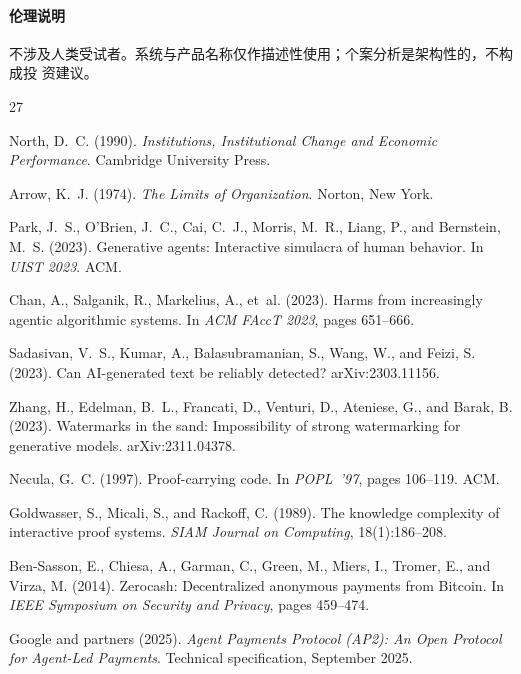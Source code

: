 \documentclass[11pt,UTF8]{ctexart}
\begin{document}
\paragraph*{伦理说明}
不涉及人类受试者。系统与产品名称仅作描述性使用；个案分析是架构性的，不构成投
资建议。
\begin{thebibliography}{27}
\small\setlength{\itemsep}{2pt}

North, D.~C. (1990). \emph{Institutions, Institutional Change and
Economic Performance}. Cambridge University Press.

Arrow, K.~J. (1974). \emph{The Limits of Organization}. Norton, New York.

Park, J.~S., O'Brien, J.~C., Cai, C.~J., Morris, M.~R., Liang, P., and
Bernstein, M.~S. (2023). Generative agents: Interactive simulacra of
human behavior. In \emph{UIST 2023}. ACM.

Chan, A., Salganik, R., Markelius, A., et~al. (2023). Harms from
increasingly agentic algorithmic systems. In \emph{ACM FAccT 2023},
pages 651--666.

Sadasivan, V.~S., Kumar, A., Balasubramanian, S., Wang, W., and Feizi, S.
(2023). Can {AI}-generated text be reliably detected? arXiv:2303.11156.

Zhang, H., Edelman, B.~L., Francati, D., Venturi, D., Ateniese, G., and
Barak, B. (2023). Watermarks in the sand: Impossibility of strong
watermarking for generative models. arXiv:2311.04378.

Necula, G.~C. (1997). Proof-carrying code. In \emph{POPL~'97}, pages
106--119. ACM.

Goldwasser, S., Micali, S., and Rackoff, C. (1989). The knowledge
complexity of interactive proof systems. \emph{SIAM Journal on
Computing}, 18(1):186--208.

Ben-Sasson, E., Chiesa, A., Garman, C., Green, M., Miers, I., Tromer, E.,
and Virza, M. (2014). Zerocash: Decentralized anonymous payments from
{Bitcoin}. In \emph{IEEE Symposium on Security and Privacy}, pages
459--474.

Google and partners (2025). \emph{Agent Payments Protocol (AP2): An Open
Protocol for Agent-Led Payments}. Technical specification, September 2025.


\end{thebibliography}
\end{document}
